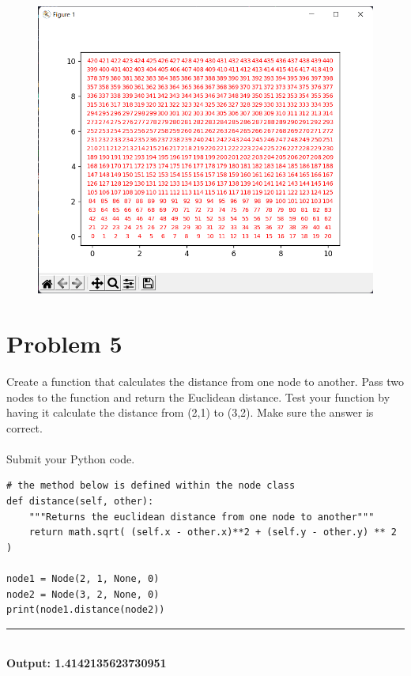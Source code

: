 \documentclass{article}
\begin{document}
\begin{figure}[h]
    \centering
    \includegraphics[width=\textwidth]{question4.png}
\end{figure}

\section*{Problem 5}
 
Create a function that calculates the distance from one node to another. Pass two nodes to the 
function and return the Euclidean distance. Test your function by having it calculate the distance 
from (2,1) to (3,2). Make sure the answer is correct. 
\\\\

\noindent Submit your Python code.
\begin{verbatim}
# the method below is defined within the node class
def distance(self, other):
    """Returns the euclidean distance from one node to another"""
    return math.sqrt( (self.x - other.x)**2 + (self.y - other.y) ** 2 )

node1 = Node(2, 1, None, 0)
node2 = Node(3, 2, None, 0)
print(node1.distance(node2))
\end{verbatim}

\noindent\rule{\textwidth}{0.4pt}\\
\textbf{Output: 1.4142135623730951}
\end{document}
